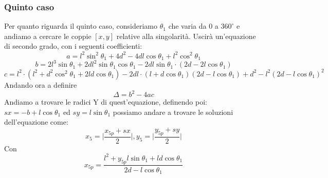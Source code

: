 \subsubsection{Quinto caso}
Per quanto riguarda il quinto caso, consideriamo $\theta_1$ che varia da 0 a $360^\circ$ e andiamo a cercare le coppie $[x,y]$ relative alla singolarità. Uscirà un'equazione di secondo grado, con i seguenti coefficienti:
\begin{equation*}
    a = l^2\sin^2\theta_1 + 4d^2-4dl\cos\theta_1 + l^2\cos^2\theta_1
\end{equation*}
\begin{equation*}
    b = 2l^3\sin\theta_1 + 2dl^2\sin\theta_1\cos\theta_1-2dl\sin\theta_1\cdot(2d-2l\cos\theta_1)
\end{equation*}
\begin{equation*}
    c = l^2\cdot(l^2+d^2\cos^2\theta_1+2ld\cos\theta_1)-2dl\cdot(l+d\cos\theta_1)(2d-l\cos\theta_1)+d^2-l^2(2d-l\cos\theta_1)^2
\end{equation*}
Andando ora a definire 
\begin{equation*}
    \Delta = b^2-4ac
\end{equation*}
Andiamo a trovare le radici Y di quest'equazione, definendo poi: $sx = -b+l\cos\theta_1$ ed $sy = l\sin\theta_1$ possiamo andare a trovare le soluzioni dell'equazione come:
\begin{equation}
    x_5 = \bigg|\frac{x_{5p}+sx}{2}\bigg|, y_5 = \bigg|\frac{y_{5p}+sy}{2}\bigg|
\end{equation}
Con 
\begin{equation*}
    x_{5p} = \frac{l^2+y_{5p}l\sin\theta_1+ld\cos\theta_1}{2d-l\cos\theta_1}
\end{equation*}
